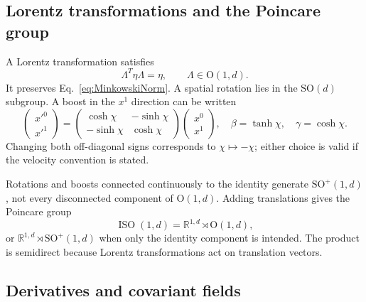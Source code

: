 \documentclass[11pt]{article}
\newcommand{\R}{\mathbb{R}}
\newcommand{\SO}{\mathrm{SO}}
\newcommand{\OO}{\mathrm{O}}
\begin{document}
\subsection{Lorentz transformations and the Poincare group}

A Lorentz transformation satisfies
\begin{equation}
  \Lambda^T\eta\Lambda=\eta,
  \qquad \Lambda\in\OO(1,d).
  \label{eq:Lorentz}
\end{equation}
It preserves Eq.~\eqref{eq:MinkowskiNorm}. A spatial rotation lies in the
\(\SO(d)\) subgroup. A boost in the \(x^1\) direction can be written
\begin{equation}
  \begin{pmatrix}x'^0\\x'^1\end{pmatrix}
  =
  \begin{pmatrix}
    \cosh\chi&-\sinh\chi\\
    -\sinh\chi&\cosh\chi
  \end{pmatrix}
  \begin{pmatrix}x^0\\x^1\end{pmatrix},
  \quad
  \beta=\tanh\chi,
  \quad
  \gamma=\cosh\chi.
  \label{eq:boost}
\end{equation}
Changing both off-diagonal signs corresponds to \(\chi\mapsto-\chi\); either
choice is valid if the velocity convention is stated.

Rotations and boosts connected continuously to the identity generate
\(\SO^+(1,d)\), not every disconnected component of \(\OO(1,d)\). Adding
translations gives the Poincare group
\begin{equation}
  \operatorname{ISO}(1,d)
  =\R^{1,d}\rtimes\OO(1,d),
  \label{eq:Poincare}
\end{equation}
or \(\R^{1,d}\rtimes\SO^+(1,d)\) when only the identity component is intended.
The product is semidirect because Lorentz transformations act on translation
vectors.

\subsection{Derivatives and covariant fields}
\end{document}

